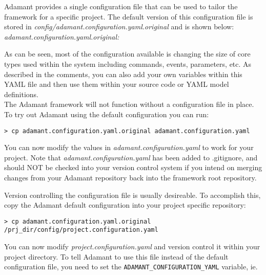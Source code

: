 Adamant provides a single configuration file that can be used to tailor the framework for a specific project. The default version of this configuration file is stored in \textit{config/adamant.configuration.yaml.original} and is shown below: \\

\textit{adamant.configuration.yaml.original:}

As can be seen, most of the configuration available is changing the size of core types used within the system including commands, events, parameters, etc. As described in the comments, you can also add your own variables within this YAML file and then use them within your source code or YAML model definitions. \\

The Adamant framework will not function without a configuration file in place. To try out Adamant using the default configuration you can run:

\vspace{5mm} %
\begin{verbatim}
> cp adamant.configuration.yaml.original adamant.configuration.yaml
\end{verbatim}
\vspace{5mm} %

You can now modify the values in \textit{adamant.configuration.yaml} to work for your project. Note that \textit{adamant.configuration.yaml} has been added to .gitignore, and should NOT be checked into your version control system if you intend on merging changes from your Adamant repository back into the framework root repository.

Version controlling the configuration file is usually desireable. To accomplish this, copy the Adamant default configuration into your project specific repository:

\vspace{5mm} %
\begin{verbatim}
> cp adamant.configuration.yaml.original /prj_dir/config/project.configuration.yaml
\end{verbatim}
\vspace{5mm} %

You can now modify \textit{project.configuration.yaml} and version control it within your project directory. To tell Adamant to use this file instead of the default configuration file, you need to set the \texttt{ADAMANT\_CONFIGURATION\_YAML} variable, ie.

